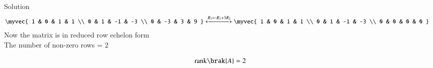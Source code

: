 \documentclass{beamer}
\begin{document}
\begin{frame}{Solution}
\begin{align}
    \myvec{
1 & 0 & 1 & 1 \\
0 & 1 & -1 & -3 \\
0 & -3 & 3 & 9
}&\xleftrightarrow[]{R_3 \leftarrow R_3 + 3 R_2}
\myvec{
1 & 0 & 1 & 1 \\
0 & 1 & -1 & -3 \\
0 & 0 & 0 & 0
}
\end{align}
Now the matrix is in reduced row echelon form \\
The number of non-zero rows = 2

\begin{align}
    \text{rank}\brak{A} = 2
\end{align}
\end{frame}
\end{document}
